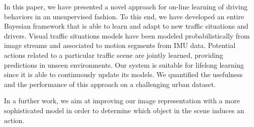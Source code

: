In this paper, we have presented a novel approach for on-line learning of
driving behaviors in an unsupervised fashion. To this end, we have developed an
entire Bayesian framework that is able to learn and adapt to new traffic
situations and drivers. Visual traffic situations models have been modeled
probabilistically from image streams and associated to motion segments from
IMU data. Potential actions related to a particular traffic scene are jointly
learned, providing predictions in unseen environments. Our system is suitable
for lifelong learning since it is able to continuously update its models. We
quantified the usefulness and the performance of this approach on a challenging
urban dataset.

In a further work, we aim at improving our image representation with a more
sophisticated model in order to determine which object in the scene induces
an action.
